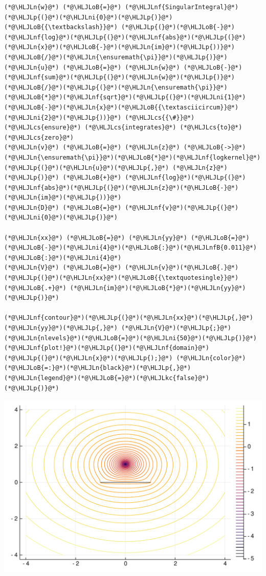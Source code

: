 \documentclass[12pt,a4paper]{article}
\newcommand{\HLJLkc}[1]{\textcolor[RGB]{59,151,46}{\textit{#1}}}
\newcommand{\HLJLn}[1]{#1}
\newcommand{\HLJLnf}[1]{\textcolor[RGB]{66,102,213}{#1}}
\newcommand{\HLJLnfB}[1]{\textcolor[RGB]{59,151,46}{#1}}
\newcommand{\HLJLni}[1]{\textcolor[RGB]{59,151,46}{#1}}
\newcommand{\HLJLoB}[1]{\textcolor[RGB]{102,102,102}{\textbf{#1}}}
\newcommand{\HLJLp}[1]{#1}
\newcommand{\HLJLcs}[1]{\textcolor[RGB]{153,153,119}{\textit{#1}}}
\begin{document}
\begin{lstlisting}
(*@\HLJLn{w}@*) (*@\HLJLoB{=}@*) (*@\HLJLnf{SingularIntegral}@*)(*@\HLJLp{(}@*)(*@\HLJLni{0}@*)(*@\HLJLp{)}@*) (*@\HLJLoB{{\textbackslash}}@*) (*@\HLJLp{(}@*)(*@\HLJLoB{-}@*)(*@\HLJLnf{log}@*)(*@\HLJLp{(}@*)(*@\HLJLnf{abs}@*)(*@\HLJLp{(}@*)(*@\HLJLn{x}@*)(*@\HLJLoB{-}@*)(*@\HLJLn{im}@*)(*@\HLJLp{))}@*)(*@\HLJLoB{/}@*)(*@\HLJLn{\ensuremath{\pi}}@*)(*@\HLJLp{)}@*)
(*@\HLJLn{u}@*) (*@\HLJLoB{=}@*) (*@\HLJLn{w}@*) (*@\HLJLoB{-}@*) (*@\HLJLnf{sum}@*)(*@\HLJLp{(}@*)(*@\HLJLn{w}@*)(*@\HLJLp{)}@*)(*@\HLJLoB{/}@*)(*@\HLJLp{(}@*)(*@\HLJLn{\ensuremath{\pi}}@*)(*@\HLJLoB{*}@*)(*@\HLJLnf{sqrt}@*)(*@\HLJLp{(}@*)(*@\HLJLni{1}@*)(*@\HLJLoB{-}@*)(*@\HLJLn{x}@*)(*@\HLJLoB{{\textasciicircum}}@*)(*@\HLJLni{2}@*)(*@\HLJLp{))}@*) (*@\HLJLcs{{\#}}@*) (*@\HLJLcs{ensure}@*) (*@\HLJLcs{integrates}@*) (*@\HLJLcs{to}@*) (*@\HLJLcs{zero}@*)
(*@\HLJLn{v}@*) (*@\HLJLoB{=}@*) (*@\HLJLn{z}@*) (*@\HLJLoB{->}@*) (*@\HLJLn{\ensuremath{\pi}}@*)(*@\HLJLoB{*}@*)(*@\HLJLnf{logkernel}@*)(*@\HLJLp{(}@*)(*@\HLJLn{u}@*)(*@\HLJLp{,}@*) (*@\HLJLn{z}@*)(*@\HLJLp{)}@*) (*@\HLJLoB{+}@*) (*@\HLJLnf{log}@*)(*@\HLJLp{(}@*)(*@\HLJLnf{abs}@*)(*@\HLJLp{(}@*)(*@\HLJLn{z}@*)(*@\HLJLoB{-}@*)(*@\HLJLn{im}@*)(*@\HLJLp{))}@*)
(*@\HLJLn{D}@*) (*@\HLJLoB{=}@*) (*@\HLJLnf{v}@*)(*@\HLJLp{(}@*)(*@\HLJLni{0}@*)(*@\HLJLp{)}@*)

(*@\HLJLn{xx}@*) (*@\HLJLoB{=}@*) (*@\HLJLn{yy}@*) (*@\HLJLoB{=}@*) (*@\HLJLoB{-}@*)(*@\HLJLni{4}@*)(*@\HLJLoB{:}@*)(*@\HLJLnfB{0.011}@*)(*@\HLJLoB{:}@*)(*@\HLJLni{4}@*)
(*@\HLJLn{V}@*) (*@\HLJLoB{=}@*) (*@\HLJLn{v}@*)(*@\HLJLoB{.}@*)(*@\HLJLp{(}@*)(*@\HLJLn{xx}@*)(*@\HLJLoB{{\textquotesingle}}@*) (*@\HLJLoB{.+}@*) (*@\HLJLn{im}@*)(*@\HLJLoB{*}@*)(*@\HLJLn{yy}@*)(*@\HLJLp{)}@*)

(*@\HLJLnf{contour}@*)(*@\HLJLp{(}@*)(*@\HLJLn{xx}@*)(*@\HLJLp{,}@*) (*@\HLJLn{yy}@*)(*@\HLJLp{,}@*) (*@\HLJLn{V}@*)(*@\HLJLp{;}@*) (*@\HLJLn{nlevels}@*)(*@\HLJLoB{=}@*)(*@\HLJLni{50}@*)(*@\HLJLp{)}@*)
(*@\HLJLnf{plot!}@*)(*@\HLJLp{(}@*)(*@\HLJLnf{domain}@*)(*@\HLJLp{(}@*)(*@\HLJLn{x}@*)(*@\HLJLp{);}@*) (*@\HLJLn{color}@*)(*@\HLJLoB{=:}@*)(*@\HLJLn{black}@*)(*@\HLJLp{,}@*) (*@\HLJLn{legend}@*)(*@\HLJLoB{=}@*)(*@\HLJLkc{false}@*)(*@\HLJLp{)}@*)
\end{lstlisting}

\includegraphics[width=\linewidth]{figures/Solutions3_9_1.pdf}
\end{document}
